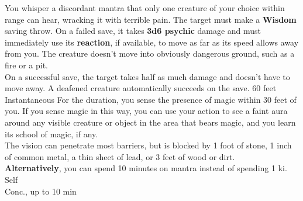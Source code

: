 \documentclass{article}
\begin{document}
\begin{center}
    {You whisper a discordant mantra that only one creature of your choice within range can hear, wracking it with terrible pain. The target must make a \textbf{Wisdom} saving throw. On a failed save, it takes \textbf{3d6 psychic} damage and must immediately use its \textbf{reaction}, if available, to move as far as its speed allows away from you. The creature doesn’t move into obviously dangerous ground, such as a fire or a pit.
    \\[1mm]
     On a successful save, the target takes half as much damage and doesn’t have to move away. A deafened creature automatically succeeds on the save.}
    {60 feet\\Instantaneous}%
    {For the duration, you sense the presence of magic within 30 feet of you. If you sense magic in this way, you can use your action to see a faint aura around any visible creature or object in the area that bears magic, and you learn its school of magic, if any.
    \\[1mm]
    The vision can penetrate most barriers, but is blocked by 1 foot of stone, 1 inch of common metal, a thin sheet of lead, or 3 feet of wood or dirt.
    \\[1mm]
    \textbf{Alternatively}, you can spend 10 minutes on mantra instead of spending 1 ki.}
    {Self\\Conc., up to 10 min}%
    
\removespace    
    

\end{center}
\end{document}
